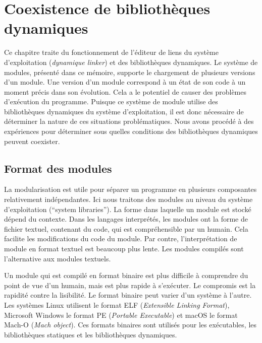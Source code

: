 \chapter{Coexistence de bibliothèques dynamiques}
\label{ch:module_systems}


Ce chapitre traite du fonctionnement de l'éditeur de liens du système
d'exploitation (\textit{dynamique linker}) et des bibliothèques dynamiques. Le
système de modules, présenté dans ce mémoire, supporte le chargement de
plusieurs versions d'un module. Une version d'un module correspond à un
état de son code à un moment précis dans son évolution.
Cela a le potentiel de causer des problèmes d'exécution du programme. Puisque
ce système de module utilise des bibliothèques dynamiques du système
d'exploitation, il est donc nécessaire de déterminer la nature de ces
situations problématiques. Nous avons procédé à des expériences pour déterminer
sous quelles conditions des bibliothèques dynamiques peuvent coexister.

\section{Format des modules}


La modularisation est utile pour séparer un programme en plusieurs composantes
relativement indépendantes. Ici nous traitons des modules au niveau du système
d'exploitation (``system libraries''). La forme dans laquelle un module est
stocké dépend du contexte. Dans les langages interprétés, les modules ont la
forme de fichier textuel, contenant du code, qui est compréhensible par un
humain. Cela facilite les modifications du code du module. Par contre,
l'interprétation de module en format textuel est beaucoup plus lente. Les
modules compilés sont l'alternative aux modules textuels.

Un module qui est compilé en format binaire est plus difficile à comprendre
du point de vue d'un humain, mais est plus rapide à s'exécuter. Le compromis
est la rapidité contre la lisibilité. Le format binaire peut varier d'un système
à l'autre. Les systèmes Linux utilisent le format ELF (\textit{Extensible Linking
Format}), Microsoft Windows le format PE (\textit{Portable Executable})
et macOS le format Mach-O (\textit{Mach object}). Ces formats binaires sont
utilisés pour les exécutables, les bibliothèques statiques et les bibliothèques
dynamiques.

